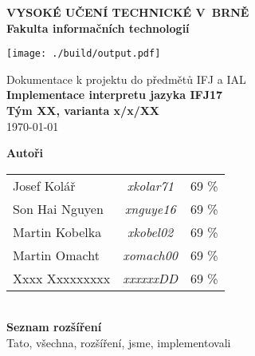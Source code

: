 \begin{titlepage}
	\centering

	{\fontsize{20pt}{15pt}\bfseries 
		VYSOKÉ UČENÍ TECHNICKÉ V~BRNĚ\\
		\vspace{8pt}
		Fakulta informačních technologií
	}

	\vspace*{64pt}

	\texttt{[image: ./build/output.pdf]}
	\vspace*{22pt}

	{\Large Dokumentace k projektu do předmětů IFJ a IAL\\}
	\vspace*{4pt}
	{\LARGE \bfseries Implementace interpretu jazyka IFJ17\\}
	\vspace*{62pt}
	{\Large \bfseries Tým XX, varianta x/x/XX\\}
	\vspace*{42pt}
	{\Large \today}

	\vspace*{64pt}
	{\Large \bfseries Autoři\\}
	\vspace*{8pt}
	\begin{tabular}{ l c r }
	  Josef Kolář & \textit{xkolar71} & 69 \% \\
	  Son Hai Nguyen & \textit{xnguye16} & 69 \% \\
	  Martin Kobelka & \textit{xkobel02} & 69 \% \\
	  Martin Omacht & \textit{xomach00} & 69 \% \\
	  Xxxx Xxxxxxxxx & \textit{xxxxxxDD} & 69 \% \\
	\end{tabular}\\
	\vspace*{32pt}
	{\Large \bfseries Seznam rozšíření\\}
	\vspace*{8pt}
	Tato, všechna, rozšíření, jsme, implementovali\\
	\vspace*{64pt}

\end{titlepage}
